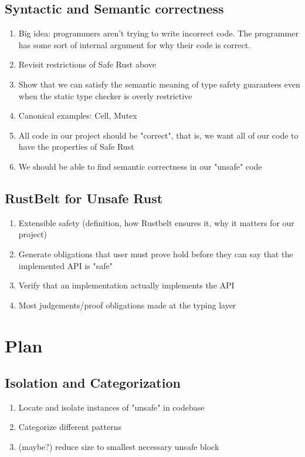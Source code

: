 \documentclass{article}
\begin{document}
\subsection{Syntactic and Semantic correctness}
\begin{enumerate}
    \item Big idea: programmers aren't trying to write incorrect code. The programmer has some sort of internal argument for why their code is correct.
    \item Revisit restrictions of Safe Rust above
    \item Show that we can satisfy the semantic meaning of type safety guarantees even when the static type checker is overly restrictive
    \item Canonical examples: Cell, Mutex
    \item All code in our project should be "correct", that is, we want all of our code to have the properties of Safe Rust
    \item We should be able to find semantic correctness in our "unsafe" code
\end{enumerate}

\subsection{RustBelt for Unsafe Rust}
\begin{enumerate}
    \item Extensible safety (definition, how Rustbelt ensures it, why it matters for our project)
    \item Generate obligations that user must prove hold before they can say that the implemented API is "safe"
    \item Verify that an implementation actually implements the API
    \item Most judgements/proof obligations made at the typing layer
\end{enumerate}

\section{Plan}
\subsection{Isolation and Categorization}
\begin{enumerate}
    \item Locate and isolate instances of "unsafe" in codebase
    \item Categorize different patterns
    \item (maybe?) reduce size to smallest necessary unsafe block
\end{enumerate}
\end{document}
